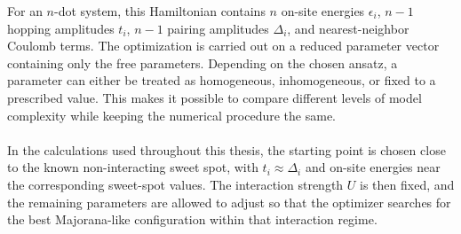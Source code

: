 For an $n$-dot system, this Hamiltonian contains $n$ on-site energies $\epsilon_i$, $n-1$ hopping amplitudes $t_i$, $n-1$ pairing amplitudes $\Delta_i$, and nearest-neighbor Coulomb terms. The optimization is carried out on a reduced parameter vector containing only the free parameters. Depending on the chosen ansatz, a parameter can either be treated as homogeneous, inhomogeneous, or fixed to a prescribed value. This makes it possible to compare different levels of model complexity while keeping the numerical procedure the same. \\ \\
In the calculations used throughout this thesis, the starting point is chosen close to the known non-interacting sweet spot, with $t_i \approx \Delta_i$ and on-site energies near the corresponding sweet-spot values. The interaction strength $U$ is then fixed, and the remaining parameters are allowed to adjust so that the optimizer searches for the best Majorana-like configuration within that interaction regime.
